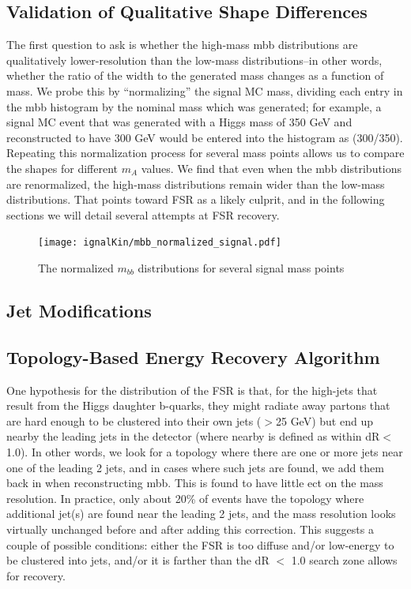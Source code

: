 \subsection{Validation of Qualitative Shape Differences}
The first question to ask is whether the high-mass mbb distributions are qualitatively lower-resolution than
the low-mass distributions–in other words, whether the ratio of the width to the generated mass changes
as a function of mass. We probe this by “normalizing” the signal MC mass, dividing each entry in the mbb
histogram by the nominal mass which was generated; for example, a signal MC event that was generated
with a Higgs mass of 350 GeV and reconstructed to have 300 GeV would be entered into the histogram
as (300/350). Repeating this normalization process for several mass points allows us to compare the
shapes for different $m_A$ values.
We find that even when the mbb distributions are renormalized, the high-mass distributions remain
wider than the low-mass distributions. That points toward FSR as a likely culprit, and in the following
sections we will detail several attempts at FSR recovery.
\begin{figure}[hbt]
  \texttt{[image: ignalKin/mbb\_normalized\_signal.pdf]}
  \label{fig:mbb_norm}
  \caption{The normalized $m_{bb}$ distributions for several signal mass points}
\end{figure}





\subsection{Jet Modifications}
\subsection{Topology-Based Energy Recovery Algorithm}
 One hypothesis for the distribution of the FSR is that, for the high-\pt jets that result from the Higgs
 daughter b-quarks, they might radiate away partons that are hard enough to be clustered into their own
 jets (\pt$>$25 GeV) but end up nearby the leading jets in the detector (where nearby is defined as within
 dR$<$1.0). In other words, we look for a topology where there are one or more jets near one of the leading
2 jets, and in cases where such jets are found, we add them back in when reconstructing mbb.
 This is found to have little ect on the mass resolution. In practice, only about 20\% of events
 have the topology where additional jet(s) are found near the leading 2 jets, and the mass resolution
 looks virtually unchanged before and after adding this correction. This suggests a couple of possible
 conditions: either the FSR is too diffuse and/or low-energy to be clustered into jets, and/or it is farther
 than the dR $<$ 1.0 search zone allows for recovery. 
    

